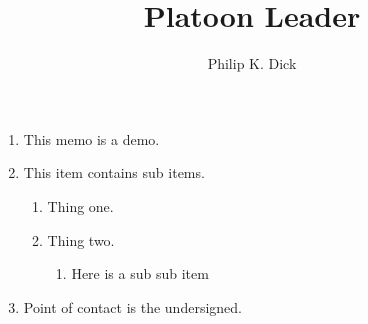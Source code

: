 \documentclass{./latex/armymemo-notikz}
\author{Philip K. Dick}\rank{1LT}\branch{EN}
\title{Platoon Leader}
\begin{document}
\begin{enumerate}
\item This memo is a demo.
\item This item contains sub items.
\begin{enumerate}
\item Thing one.
\item Thing two.
\begin{enumerate}
\item Here is a sub sub item
\end{enumerate}
\end{enumerate}
\item Point of contact is the undersigned.
\end{enumerate}
\end{document}
